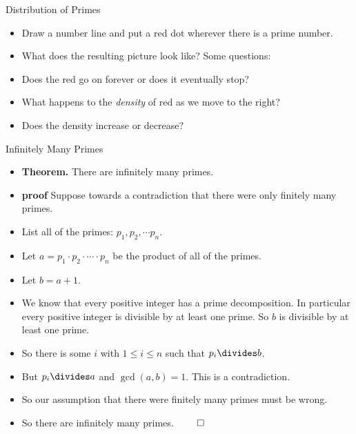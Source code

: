 \documentclass{beamer}
\begin{document}
\begin{frame}{Distribution of Primes}

\begin{itemize}
  \item Draw a number line and put a red dot wherever there is a prime number.
  \item What does the resulting picture look like? Some questions:
  \item Does the red go on forever or does it eventually stop?
  \item What happens to the \emph{density} of red as we move to the right?
  \item Does the density increase or decrease?
\end{itemize}

\end{frame}

\begin{frame}{Infinitely Many Primes}

\begin{itemize}
  \item \textbf{Theorem.} There are infinitely many primes.
  \item \textbf{proof} Suppose towards a contradiction that there were only finitely many primes.
  \item List all of the primes: $p_1, p_2,  \cdots p_n$.
  \item Let $a = p_1 \cdot p_2 \cdot \cdots \cdot p_n$ be the product of all of the primes.
  \item Let $b=a+1$.
  \item We know that every positive integer has a prime decomposition. In particular every positive
  integer is divisible by at least one prime. So $b$ is divisible by at least one prime.
  \item So there is some $i$ with $1\leq i\leq n$ such that $p_i \divides b$.
  \item But $p_i \divides a$ and $\gcd(a,b)=1$. This is a contradiction.
  \item So our assumption that there were finitely many primes must be wrong.
  \item So there are infinitely many primes. $\qed$
\end{itemize}

\end{frame}
\end{document}
